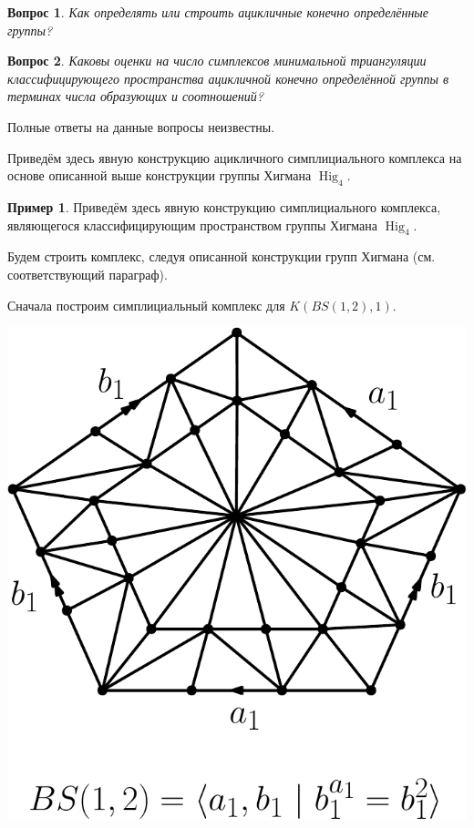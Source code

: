 \documentclass[14pt, dvipsnames, twoside]{extarticle}
\newtheorem{question}{Вопрос}
\theoremstyle{definition}
\newtheorem{example}{Пример}
\theoremstyle{remark}
\DeclareMathOperator{\Hig}{\mathrm{Hig}}
\begin{document}
\begin{question}
Как определять или строить ацикличные конечно определённые группы?
\end{question}


\begin{question}
Каковы оценки на число симплексов минимальной триангуляции классифицирующего пространства ацикличной конечно определённой группы в терминах числа образующих и соотношений?
\end{question}


Полные ответы на данные вопросы неизвестны.

Приведём здесь явную конструкцию ацикличного симплициального комплекса на основе описанной выше конструкции группы Хигмана $\Hig_4$.


\begin{example}

Приведём здесь явную конструкцию симплициального комплекса, являющегося классифицирующим пространством группы Хигмана $\Hig_4$.

Будем строить комплекс, следуя описанной конструкции групп Хигмана (см. соответствующий параграф).

Сначала построим симплициальный комплекс для $K(BS(1, 2), 1)$.


\begin{center}
\includegraphics[scale=0.6]{BS}
\end{center}



\end{example}
\end{document}
